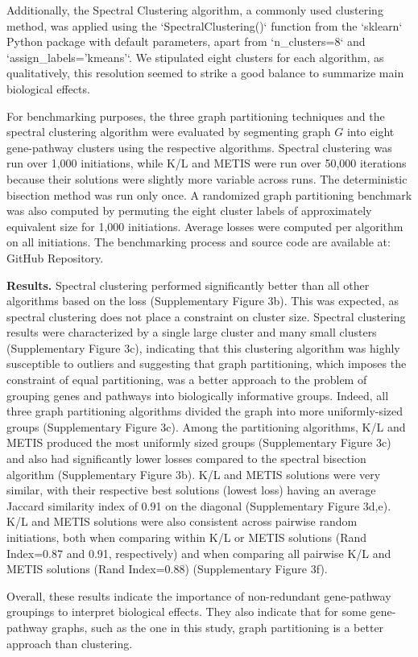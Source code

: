 Additionally, the Spectral Clustering algorithm, a commonly used clustering method, was applied using the `SpectralClustering()` function from the `sklearn` Python package with default parameters, apart from `n\_clusters=8` and `assign\_labels='kmeans'`. We stipulated eight clusters for each algorithm, as qualitatively, this resolution seemed to strike a good balance to summarize main biological effects.

For benchmarking purposes, the three graph partitioning techniques and the spectral clustering algorithm were evaluated by segmenting graph $G$ into eight gene-pathway clusters using the respective algorithms. Spectral clustering was run over 1,000 initiations, while K/L and METIS were run over 50,000 iterations because their solutions were slightly more variable across runs. The deterministic bisection method was run only once. A randomized graph partitioning benchmark was also computed by permuting the eight cluster labels of approximately equivalent size for 1,000 initiations. Average losses were computed per algorithm on all initiations. The benchmarking process and source code are available at: GitHub Repository.

\textbf{Results.}\newline
Spectral clustering performed significantly better than all other algorithms based on the loss (Supplementary Figure 3b). This was expected, as spectral clustering does not place a constraint on cluster size. Spectral clustering results were characterized by a single large cluster and many small clusters (Supplementary Figure 3c), indicating that this clustering algorithm was highly susceptible to outliers and suggesting that graph partitioning, which imposes the constraint of equal partitioning, was a better approach to the problem of grouping genes and pathways into biologically informative groups. Indeed, all three graph partitioning algorithms divided the graph into more uniformly-sized groups (Supplementary Figure 3c). Among the partitioning algorithms, K/L and METIS produced the most uniformly sized groups (Supplementary Figure 3c) and also had significantly lower losses compared to the spectral bisection algorithm (Supplementary Figure 3b). K/L and METIS solutions were very similar, with their respective best solutions (lowest loss) having an average Jaccard similarity index of 0.91 on the diagonal (Supplementary Figure 3d,e). K/L and METIS solutions were also consistent across pairwise random initiations, both when comparing within K/L or METIS solutions (Rand Index=0.87 and 0.91, respectively) and when comparing all pairwise K/L and METIS solutions (Rand Index=0.88) (Supplementary Figure 3f).

Overall, these results indicate the importance of non-redundant gene-pathway groupings to interpret biological effects. They also indicate that for some gene-pathway graphs, such as the one in this study, graph partitioning is a better approach than clustering.
